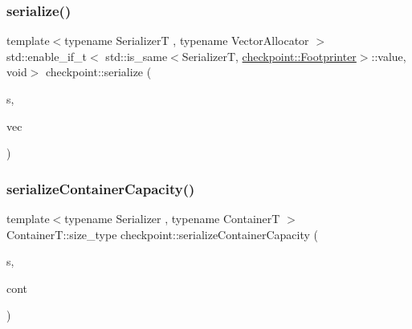 \mbox{\label{namespacecheckpoint_af95ab4d3ad37bb33b284e3a51047d685}} 
\subsubsection{\texorpdfstring{serialize()}{serialize()}\hspace{0.1cm}{\footnotesize\ttfamily [30/30]}}
{\footnotesize\ttfamily template$<$typename SerializerT , typename Vector\+Allocator $>$ \\
std\+::enable\+\_\+if\+\_\+t$<$ std\+::is\+\_\+same$<$SerializerT, \hyperlink{structcheckpoint_1_1_footprinter}{checkpoint\+::\+Footprinter}$>$\+::value, void$>$ checkpoint\+::serialize (\begin{DoxyParamCaption}\item[{SerializerT \&}]{s,  }\item[{std\+::vector$<$ bool, Vector\+Allocator $>$ \&}]{vec }\end{DoxyParamCaption})}

\mbox{\label{namespacecheckpoint_abb25020fd55429c701342e79205a8d9a}} 
\subsubsection{\texorpdfstring{serialize\+Container\+Capacity()}{serializeContainerCapacity()}}
{\footnotesize\ttfamily template$<$typename Serializer , typename ContainerT $>$ \\
Container\+T\+::size\+\_\+type checkpoint\+::serialize\+Container\+Capacity (\begin{DoxyParamCaption}\item[{Serializer \&}]{s,  }\item[{ContainerT \&}]{cont }\end{DoxyParamCaption})\hspace{0.3cm}{\ttfamily [inline]}}

\mbox{\label{namespacecheckpoint_a9c880ba9bb9a106e784e06554b2fbcf2}} 
